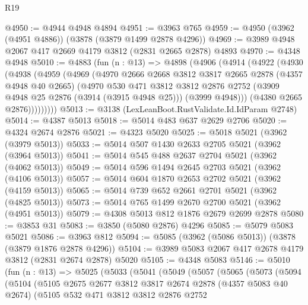 \begin{lexlean}{R19}
\begin{coremodule}
@4950 := @4944 @4948 @4894
@4951 := @3963 @765
@4959 := @4950 (@3962 (@4951 @4886)) (@3878 (@3879 @1499 @2878 @4296))
@4969 := @3989 @4948 @2067 @417 @2669 @4179 @3812 (@2831 @2665 @2878) @4893
@4970 := @4348 @4948
@5010 := @4883
    (fun (n : @13) =>
    @4898
      (@4906
        (@4914
          (@4922
            (@4930
              (@4938
                (@4959
                  (@4969
                    (@4970
                      @2666
                      @2668
                      @3812
                      @3817
                      @2665
                      @2878
                      (@4357 @4948 @40 @2665)
                      (@4970
                        @530
                        @471
                        @3812
                        @3812
                        @2876
                        @2752
                        (@3909 @4948 @25 @2876 (@3914 (@3915 @4948 @25)))
                        (@3999 @4948)))
                    (@4380 @2665 @2876)))))))))
@5013 := @3138 (LexLeanBoot.RustValidate.Id.IdParam @2748)
@5014 := @4387 @5013
@5018 := @5014 @483 @637 @2629 @2706
@5020 := @4324 @2674 @2876
@5021 := @4323 @5020
@5025 := @5018 @5021 (@3962 (@3979 @5013))
@5033 := @5014 @507 @1430 @2633 @2705 @5021 (@3962 (@3964 @5013))
@5041 := @5014 @545 @488 @2637 @2704 @5021 (@3962 (@4062 @5013))
@5049 := @5014 @596 @1494 @2645 @2703 @5021 (@3962 (@4106 @5013))
@5057 := @5014 @604 @1870 @2653 @2702 @5021 (@3962 (@4159 @5013))
@5065 := @5014 @739 @652 @2661 @2701 @5021 (@3962 (@4825 @5013))
@5073 := @5014 @765 @1499 @2670 @2700 @5021 (@3962 (@4951 @5013))
@5079 := @4308 @5013 @812 @1876 @2679 @2699 @2878
@5080 := @3853 @31
@5083 := @3850 (@5080 @2876) @4296
@5085 := @5079 @5083 @5021
@5086 := @3963 @812
@5094 := @5085 (@3962 (@5086 @5013)) (@3878 (@3879 @1876 @2878 @4296))
@5104 := @3989 @5083 @2067 @417 @2678 @4179 @3812 (@2831 @2674 @2878) @5020
@5105 := @4348 @5083
@5146 := @5010
    (fun (n : @13) =>
    @5025
      (@5033
        (@5041
          (@5049
            (@5057
              (@5065
                (@5073
                  (@5094
                    (@5104
                      (@5105
                        @2675
                        @2677
                        @3812
                        @3817
                        @2674
                        @2878
                        (@4357 @5083 @40 @2674)
                        (@5105
                          @532
                          @471
                          @3812
                          @3812
                          @2876
                          @2752

\end{coremodule}
\end{lexlean}
